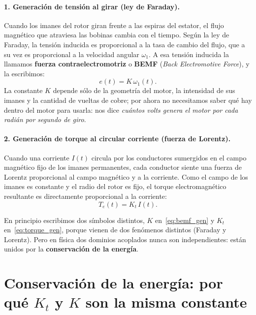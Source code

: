 \documentclass[11pt,a4paper,oneside]{book}
\begin{document}
\paragraph{1. Generación de tensión al girar (ley de Faraday).}
Cuando los imanes del rotor giran frente a las espiras del estator, el flujo
magnético que atraviesa las bobinas cambia con el tiempo. Según la ley de
Faraday, la tensión inducida es proporcional a la tasa de cambio del flujo, que
a su vez es proporcional a la velocidad angular $\omega_1$. A esa tensión
inducida la llamamos \textbf{fuerza contraelectromotriz} o \textbf{BEMF}
(\emph{Back Electromotive Force}), y la escribimos:
\begin{equation}
  e(t) = K\,\omega_1(t).
  \label{eq:bemf_gen}
\end{equation}
La constante $K$ depende sólo de la geometría del motor, la intensidad de sus
imanes y la cantidad de vueltas de cobre; por ahora no necesitamos saber qué
hay dentro del motor para usarla: nos dice \emph{cuántos volts genera el motor
por cada radián por segundo de giro}.

\paragraph{2. Generación de torque al circular corriente (fuerza de Lorentz).}
Cuando una corriente $I(t)$ circula por los conductores sumergidos en el campo
magnético fijo de los imanes permanentes, cada conductor siente una fuerza de
Lorentz proporcional al campo magnético y a la corriente. Como el campo de los
imanes es constante y el radio del rotor es fijo, el torque electromagnético
resultante es directamente proporcional a la corriente:
\begin{equation}
  T_e(t) = K_t\,I(t).
  \label{eq:torque_gen}
\end{equation}

En principio escribimos dos símbolos distintos, $K$ en~\eqref{eq:bemf_gen} y
$K_t$ en~\eqref{eq:torque_gen}, porque vienen de dos fenómenos distintos
(Faraday y Lorentz). Pero en física dos dominios acoplados nunca son
independientes: están unidos por la \textbf{conservación de la energía}.

\section{Conservación de la energía: por qué \texorpdfstring{$K_t$ y $K$}{Kt y K} son la misma constante}
\end{document}
